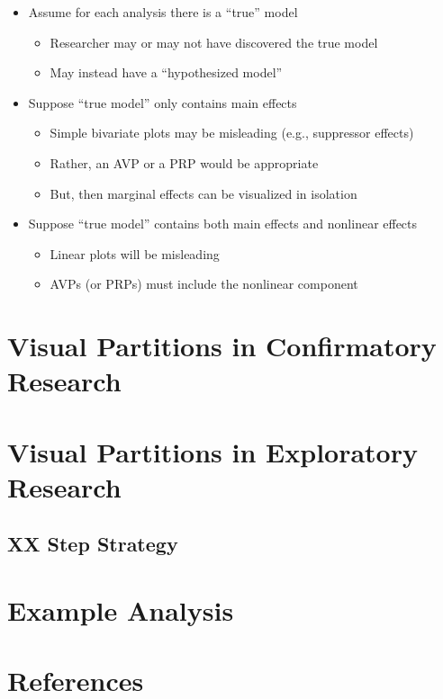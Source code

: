 \documentclass[
  english,
  doc,floatsintext]{apa6}
\providecommand{\tightlist}{%
  \setlength{\itemsep}{0pt}\setlength{\parskip}{0pt}}
\begin{document}
\begin{itemize}
\tightlist
\item
  Assume for each analysis there is a ``true'' model

  \begin{itemize}
  \tightlist
  \item
    Researcher may or may not have discovered the true model
  \item
    May instead have a ``hypothesized model''
  \end{itemize}
\item
  Suppose ``true model'' only contains main effects

  \begin{itemize}
  \tightlist
  \item
    Simple bivariate plots may be misleading (e.g., suppressor effects)
  \item
    Rather, an AVP or a PRP would be appropriate
  \item
    But, then marginal effects can be visualized in isolation
  \end{itemize}
\item
  Suppose ``true model'' contains both main effects and nonlinear effects

  \begin{itemize}
  \tightlist
  \item
    Linear plots will be misleading
  \item
    AVPs (or PRPs) must include the nonlinear component
  \end{itemize}
\end{itemize}

\hypertarget{visual-partitions-in-confirmatory-research}{%
\section{Visual Partitions in Confirmatory Research}\label{visual-partitions-in-confirmatory-research}}

\hypertarget{visual-partitions-in-exploratory-research}{%
\section{Visual Partitions in Exploratory Research}\label{visual-partitions-in-exploratory-research}}

\hypertarget{xx-step-strategy}{%
\subsection{XX Step Strategy}\label{xx-step-strategy}}

\hypertarget{example-analysis}{%
\section{Example Analysis}\label{example-analysis}}

\pagebreak

\hypertarget{references}{%
\section{References}\label{references}}
\end{document}
